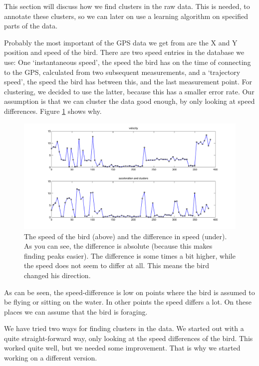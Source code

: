 This section will discuss how we find clusters in the raw data. 
 This is needed, to annotate these clusters, so we can later on use a
 learning algorithm on specified parts of the data.

     Probably the most important of the GPS data we get from \bits are the X and Y
     position and speed of the bird. There are two speed entries in the database we
     use: One `instantaneous speed', the speed the bird has on the time of
     connecting to the GPS, calculated from two subsequent measurements, and a
     `trajectory speed', the speed the bird has between this, and the last
     measurement point. For clustering, we decided to use the latter, because this
     has a smaller error rate. Our assumption is that we can cluster the data good
     enough, by only looking at speed differences. Figure \ref{fig:speed} shows
     why.
\begin{figure}
\centering
\includegraphics[width=.8\textwidth]{speed.pdf}
\caption{The speed of the bird (above) and the difference in speed (under). As
you can see, the difference is absolute (because this makes finding peaks
easier). The difference is some times a bit higher, while the speed does not
seem to differ at all. This means the bird changed his direction.}
\label{fig:speed}
\end{figure}

 As can be seen, the speed-difference is low on points where the bird is assumed
 to be flying or sitting on the water. In other points the speed differs a lot.
 On these places we can assume that the bird is foraging.

 We have tried two ways for finding clusters in the data. We started out with a
 quite straight-forward way, only looking at the speed differences of the bird.
 This worked quite well, but we needed some improvement. That is why we started
 working on a different version.

